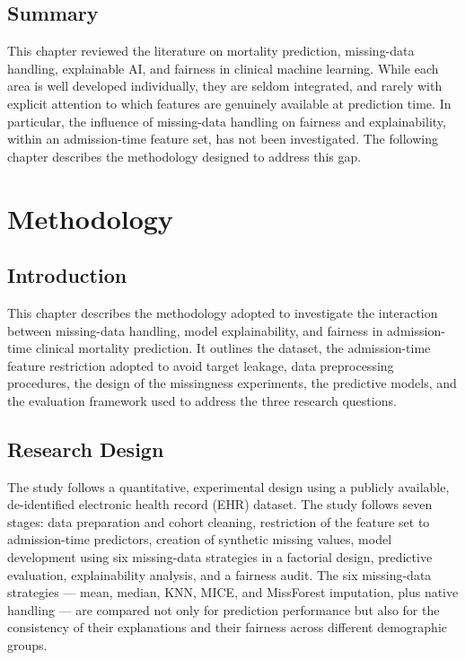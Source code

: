 \documentclass[12pt,a4paper]{report}
\begin{document}
\section{Summary}
This chapter reviewed the literature on mortality prediction, missing-data handling, explainable AI, and fairness in clinical machine learning. While each area is well developed individually, they are seldom integrated, and rarely with explicit attention to which features are genuinely available at prediction time. In particular, the influence of missing-data handling on fairness and explainability, within an admission-time feature set, has not been investigated. The following chapter describes the methodology designed to address this gap.


\chapter{Methodology}

\section{Introduction}
This chapter describes the methodology adopted to investigate the interaction between missing-data handling, model explainability, and fairness in admission-time clinical mortality prediction. It outlines the dataset, the admission-time feature restriction adopted to avoid target leakage, data preprocessing procedures, the design of the missingness experiments, the predictive models, and the evaluation framework used to address the three research questions.


\section{Research Design}
The study follows a quantitative, experimental design using a publicly available, de-identified electronic health record (EHR) dataset. The study follows seven stages: data preparation and cohort cleaning, restriction of the feature set to admission-time predictors, creation of synthetic missing values, model development using six missing-data strategies in a factorial design, predictive evaluation, explainability analysis, and a fairness audit. The six missing-data strategies --- mean, median, KNN, MICE, and MissForest imputation, plus native handling --- are compared not only for prediction performance but also for the consistency of their explanations and their fairness across different demographic groups.
\end{document}
